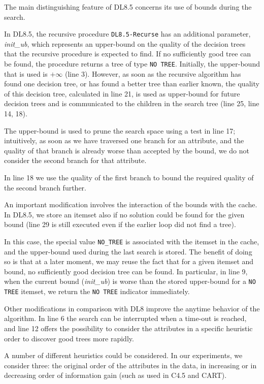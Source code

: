 The main distinguishing feature of DL8.5 concerns its use of bounds during the search.

In DL8.5, the recursive procedure \verb|DL8.5-Recurse| has an additional parameter, \emph{init\_ub}, which represents an upper-bound on the quality of the decision trees that the recursive procedure is expected to find. If no sufficiently good tree can be found, the procedure returns a tree of type \verb|NO TREE|. Initially, the upper-bound that is used is $+\infty$ (line 3). However, as soon as the recursive algorithm has found one decision tree, or has found a better tree than earlier known, the quality of this decision tree, calculated in line 21, is used as upper-bound for future decision trees and is communicated to the children in the search tree (line 25, line 14, 18).

The upper-bound is used to prune the search space using a test in line 17; intuitively, as soon as we have traversed one branch for an attribute, and the quality of that branch is already worse than accepted by the bound, we do not consider the second branch for that attribute.

In line 18 we use the quality of the first branch to bound the required quality of the second branch further.

An important modification involves the interaction of the bounds with the cache. In DL8.5, we store an itemset also if no solution could be found for the given bound (line 29 is still executed even if the earlier loop did not find a tree).

In this case, the special value \verb|NO_TREE| is associated with the itemset in the cache, and the upper-bound used during the last search is stored. The benefit of doing so is that at a later moment, we may reuse the fact that for a given itemset and bound, no sufficiently good decision tree can be found. In particular, in line 9, when the current bound (\emph{init\_ub}) is worse than the stored upper-bound for a \verb|NO TREE| itemset, we return the \verb|NO TREE| indicator immediately.

Other modifications in comparison with DL8 improve the anytime behavior of the algorithm. In line 6 the search can be interrupted when a time-out is reached, and line 12 offers the possibility to consider the attributes in a specific heuristic order to discover good trees more rapidly.

A number of different heuristics could be considered. In our experiments, we consider three: the original order of the attributes in the data, in increasing or in decreasing order of information gain (such as used in C4.5 and CART).

